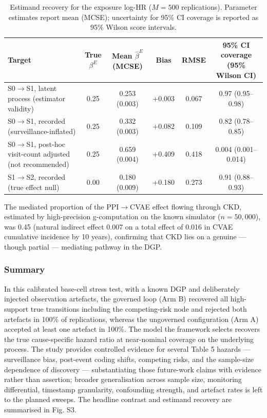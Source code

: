 \documentclass[sn-vancouver-num]{sn-jnl}
\begin{document}
\begin{table}[h]
\caption{Estimand recovery for the exposure log-HR ($M = 500$ replications). Parameter estimates report mean (MCSE); uncertainty for 95\% CI coverage is reported as 95\% Wilson score intervals.}
\label{tab:estimand-recovery}
\centering
\footnotesize
\begin{tabularx}{\textwidth}{@{}Yccccc@{}}
\toprule
\textbf{Target} & \textbf{True $\beta^E$} & \textbf{Mean $\hat{\beta}^E$ (MCSE)} & \textbf{Bias} & \textbf{RMSE} & \textbf{95\% CI coverage (95\% Wilson CI)} \\
\midrule
S0$\rightarrow$S1, latent process (estimator validity) & 0.25 & 0.253 (0.003) & +0.003 & 0.067 & 0.97 (0.95--0.98) \\
S0$\rightarrow$S1, recorded (surveillance-inflated) & 0.25 & 0.332 (0.003) & +0.082 & 0.109 & 0.82 (0.78--0.85) \\
S0$\rightarrow$S1, post-hoc visit-count adjusted (not recommended) & 0.25 & 0.659 (0.004) & +0.409 & 0.418 & 0.004 (0.001--0.014) \\
S1$\rightarrow$S2, recorded (true effect null) & 0.00 & 0.180 (0.009) & +0.180 & 0.273 & 0.91 (0.88--0.93) \\
\bottomrule
\end{tabularx}
\end{table}

The mediated proportion of the PPI$\rightarrow$CVAE effect flowing through CKD, estimated by high-precision g-computation on the known simulator ($n = 50{,}000$), was 0.45 (natural indirect effect 0.007 on a total effect of 0.016 in CVAE cumulative incidence by 10 years), confirming that CKD lies on a genuine --- though partial --- mediating pathway in the DGP.

\subsubsection{Summary}
In this calibrated base-cell stress test, with a known DGP and deliberately injected observation artefacts, the governed loop (Arm B) recovered all high-support true transitions including the competing-risk node and rejected both artefacts in 100\% of replications, whereas the ungoverned configuration (Arm A) accepted at least one artefact in 100\%. The model the framework selects recovers the true cause-specific hazard ratio at near-nominal coverage on the underlying process. The study provides controlled evidence for several Table 5 hazards --- surveillance bias, post-event coding shifts, competing risks, and the sample-size dependence of discovery --- substantiating those future-work claims with evidence rather than assertion; broader generalisation across sample size, monitoring differential, timestamp granularity, confounding strength, and artefact rates is left to the planned sweeps. The headline contrast and estimand recovery are summarised in Fig. S3.
\end{document}
